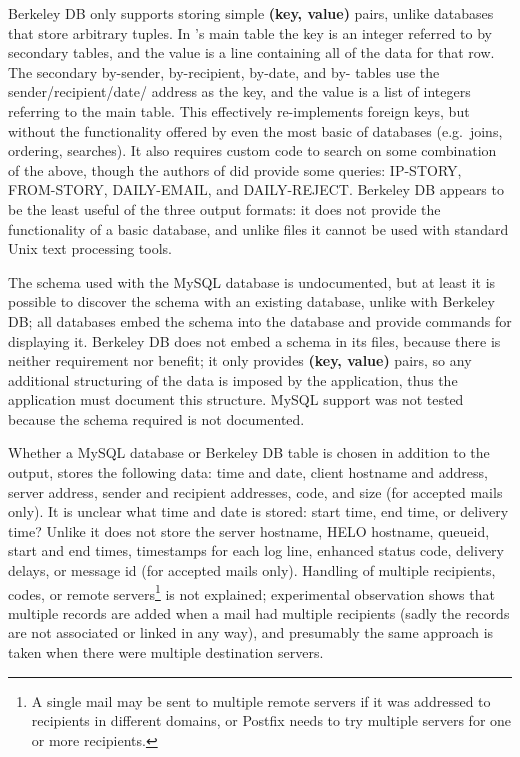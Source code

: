 Berkeley DB only supports storing simple \textbf{(key, value)} pairs,
unlike  databases that store arbitrary tuples.  In
's main table the key is an integer referred to by secondary
tables, and the value is a  line containing all of the data
for that row.  The secondary by-sender, by-recipient, by-date, and
by- tables use the sender/recipient/date/ address
as the key, and the value is a  list of integers referring to
the main table.  This effectively re-implements  foreign keys,
but without the functionality offered by even the most basic of
 databases (e.g.\ joins, ordering, searches).  It also
requires custom code to search on some combination of the above, though the
authors of  did provide some queries: IP-STORY, FROM-STORY,
DAILY-EMAIL, and DAILY-REJECT\@.  Berkeley DB appears to be the least
useful of the three output formats: it does not provide the functionality
of a basic  database, and unlike  files it cannot
be used with standard Unix text processing tools.

The schema used with the MySQL database is undocumented, but at least it is
possible to discover the schema with an existing  database,
unlike with Berkeley DB\@; all  databases embed the schema
into the database and provide commands for displaying it.  Berkeley DB does
not embed a schema in its files, because there is neither requirement nor
benefit; it only provides \textbf{(key, value)} pairs, so any additional
structuring of the data is imposed by the application, thus the application
must document this structure.  MySQL support was not tested because the
schema required is not documented.

Whether a MySQL database or Berkeley DB table is chosen in addition to the
 output,  stores the following data: time and
date, client hostname and  address, server 
address, sender and recipient addresses,  code, and size (for
accepted mails only).  It is unclear what time and date is stored: start
time, end time, or delivery time?  Unlike \parsername{} it does not store
the server hostname, HELO hostname, queueid, start and end times,
timestamps for each log line, enhanced status code, delivery delays, or
message id (for accepted mails only).  Handling of multiple recipients,
 codes, or remote servers\footnote{A single mail may be sent
to multiple remote servers if it was addressed to recipients in different
domains, or Postfix needs to try multiple servers for one or more
recipients.} is not explained; experimental observation shows that multiple
records are added when a mail had multiple recipients (sadly the records
are not associated or linked in any way), and presumably the same approach
is taken when there were multiple destination servers.

